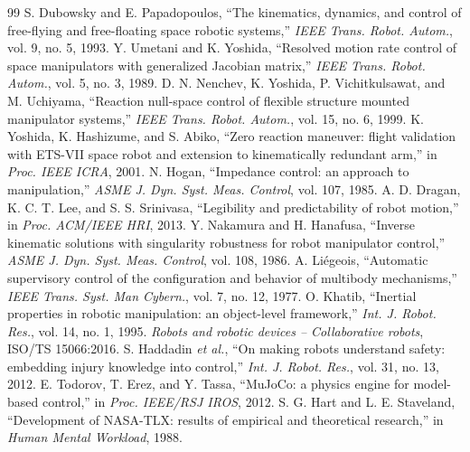 \documentclass[conference]{IEEEtran}
\begin{document}

\begin{thebibliography}{99}
 S. Dubowsky and E. Papadopoulos, ``The kinematics, dynamics, and control of free-flying and free-floating space robotic systems,'' \emph{IEEE Trans. Robot. Autom.}, vol. 9, no. 5, 1993.
 Y. Umetani and K. Yoshida, ``Resolved motion rate control of space manipulators with generalized Jacobian matrix,'' \emph{IEEE Trans. Robot. Autom.}, vol. 5, no. 3, 1989.
 D. N. Nenchev, K. Yoshida, P. Vichitkulsawat, and M. Uchiyama, ``Reaction null-space control of flexible structure mounted manipulator systems,'' \emph{IEEE Trans. Robot. Autom.}, vol. 15, no. 6, 1999.
 K. Yoshida, K. Hashizume, and S. Abiko, ``Zero reaction maneuver: flight validation with ETS-VII space robot and extension to kinematically redundant arm,'' in \emph{Proc. IEEE ICRA}, 2001.
 N. Hogan, ``Impedance control: an approach to manipulation,'' \emph{ASME J. Dyn. Syst. Meas. Control}, vol. 107, 1985.
 A. D. Dragan, K. C. T. Lee, and S. S. Srinivasa, ``Legibility and predictability of robot motion,'' in \emph{Proc. ACM/IEEE HRI}, 2013.
 Y. Nakamura and H. Hanafusa, ``Inverse kinematic solutions with singularity robustness for robot manipulator control,'' \emph{ASME J. Dyn. Syst. Meas. Control}, vol. 108, 1986.
 A. Li\'egeois, ``Automatic supervisory control of the configuration and behavior of multibody mechanisms,'' \emph{IEEE Trans. Syst. Man Cybern.}, vol. 7, no. 12, 1977.
 O. Khatib, ``Inertial properties in robotic manipulation: an object-level framework,'' \emph{Int. J. Robot. Res.}, vol. 14, no. 1, 1995.
 \emph{Robots and robotic devices -- Collaborative robots}, ISO/TS 15066:2016.
 S. Haddadin \emph{et al.}, ``On making robots understand safety: embedding injury knowledge into control,'' \emph{Int. J. Robot. Res.}, vol. 31, no. 13, 2012.
 E. Todorov, T. Erez, and Y. Tassa, ``MuJoCo: a physics engine for model-based control,'' in \emph{Proc. IEEE/RSJ IROS}, 2012.
 S. G. Hart and L. E. Staveland, ``Development of NASA-TLX: results of empirical and theoretical research,'' in \emph{Human Mental Workload}, 1988.
\end{thebibliography}
\end{document}
